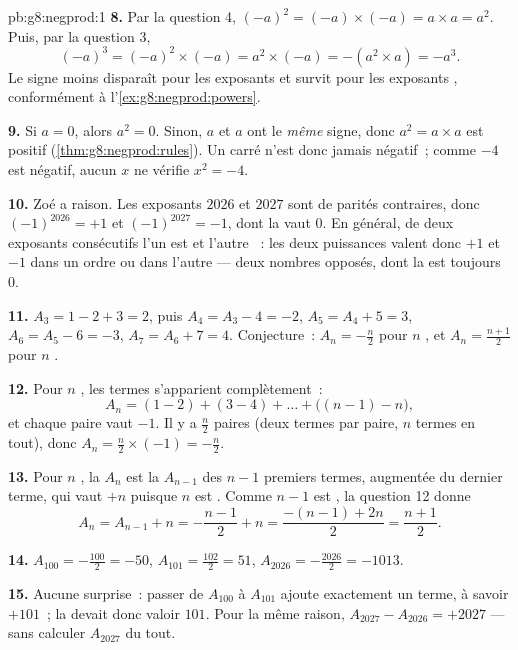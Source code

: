\begin{solution}{pb:g8:negprod:1}
\textbf{8.} Par la question 4,
$(-a)^2 = (-a) \times (-a) = a \times a = a^2$. Puis, par la
question 3,
\[
(-a)^3 = (-a)^2 \times (-a) = a^2 \times (-a) = -(a^2 \times a)
= -a^3 .
\]
Le signe moins disparaît pour les exposants  et survit pour les
exposants , conformément à l'\cref{ex:g8:negprod:powers}.

\textbf{9.} Si $a = 0$, alors $a^2 = 0$. Sinon, $a$ et $a$ ont le
\emph{même} signe, donc $a^2 = a \times a$ est positif
(\cref{thm:g8:negprod:rules}). Un carré n'est donc jamais négatif~;
comme $-4$ est négatif, aucun  $x$ ne vérifie
$x^2 = -4$.

\textbf{10.} Zoé a raison. Les exposants $2026$ et $2027$ sont de
parités contraires, donc $(-1)^{2026} = +1$ et
$(-1)^{2027} = -1$, dont la  vaut $0$. En général, de deux
exposants consécutifs l'un est  et l'autre ~: les deux
puissances valent donc $+1$ et $-1$ dans un ordre ou dans l'autre
--- deux nombres opposés, dont la  est toujours $0$.

\textbf{11.} $A_3 = 1 - 2 + 3 = 2$, puis $A_4 = A_3 - 4 = -2$,
$A_5 = A_4 + 5 = 3$, $A_6 = A_5 - 6 = -3$, $A_7 = A_6 + 7 = 4$.
Conjecture~: $A_n = -\frac{n}{2}$ pour $n$ , et
$A_n = \frac{n+1}{2}$ pour $n$ .

\textbf{12.} Pour $n$ , les termes s'apparient complètement~:
\[
A_n = (1 - 2) + (3 - 4) + \dots + \bigl((n-1) - n\bigr),
\]
et chaque paire vaut $-1$. Il y a $\frac{n}{2}$ paires (deux termes
par paire, $n$ termes en tout), donc
$A_n = \frac{n}{2} \times (-1) = -\frac{n}{2}$.

\textbf{13.} Pour $n$ , la  $A_n$ est la  $A_{n-1}$
des $n - 1$ premiers termes, augmentée du dernier terme, qui vaut
$+n$ puisque $n$ est . Comme $n - 1$ est , la question 12
donne
\[
A_n = A_{n-1} + n = -\frac{n-1}{2} + n
= \frac{-(n-1) + 2n}{2} = \frac{n+1}{2} .
\]

\textbf{14.} $A_{100} = -\frac{100}{2} = -50$, \quad
$A_{101} = \frac{102}{2} = 51$, \quad
$A_{2026} = -\frac{2026}{2} = -1013$.

\textbf{15.} Aucune surprise~: passer de $A_{100}$ à $A_{101}$
ajoute exactement un terme, à savoir $+101$~; la  devait
donc valoir $101$. Pour la même raison,
$A_{2027} - A_{2026} = +2027$ --- sans calculer $A_{2027}$ du tout.
\end{solution}
